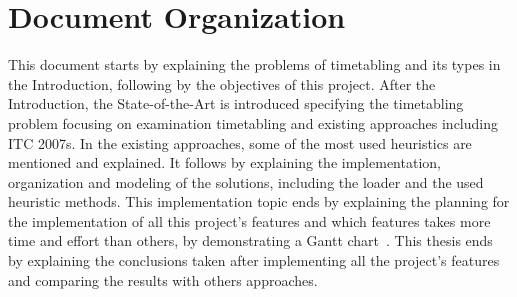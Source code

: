 \section{Document Organization}

This document starts by explaining the problems of timetabling and its types in the Introduction, following by the objectives of this project. After the Introduction, the State-of-the-Art is introduced specifying the timetabling problem focusing on examination timetabling and existing approaches including ITC 2007s. In the existing approaches, some of the most used heuristics are mentioned and explained. It follows by explaining the implementation, organization and modeling of the solutions, including the loader and the used heuristic methods. This implementation topic ends by explaining the planning for the implementation of all this project's features and which features takes more time and effort than others, by demonstrating a Gantt chart~\cite{Wilson2003}. This thesis ends by explaining the conclusions taken after implementing all the project's features and comparing the results with others approaches.





